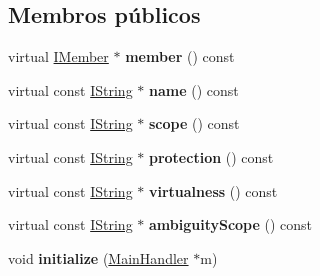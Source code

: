 \subsection*{Membros públicos}
\begin{DoxyCompactItemize}
\item 
\hypertarget{class_member_reference_a3db97c8ef39fd285ef6c96542ea50e11}{virtual \hyperlink{class_i_member}{I\-Member} $\ast$ {\bfseries member} () const }\label{class_member_reference_a3db97c8ef39fd285ef6c96542ea50e11}

\item 
\hypertarget{class_member_reference_a61b3e127d271cd613cc928e35f60125e}{virtual const \hyperlink{class_i_string}{I\-String} $\ast$ {\bfseries name} () const }\label{class_member_reference_a61b3e127d271cd613cc928e35f60125e}

\item 
\hypertarget{class_member_reference_a6a6e1de7787ea3956283635410ed1c58}{virtual const \hyperlink{class_i_string}{I\-String} $\ast$ {\bfseries scope} () const }\label{class_member_reference_a6a6e1de7787ea3956283635410ed1c58}

\item 
\hypertarget{class_member_reference_a24b1e5cd2d99544d15743ba66fe7a3f3}{virtual const \hyperlink{class_i_string}{I\-String} $\ast$ {\bfseries protection} () const }\label{class_member_reference_a24b1e5cd2d99544d15743ba66fe7a3f3}

\item 
\hypertarget{class_member_reference_afbdd0994aec9f99296d2fe6579920f51}{virtual const \hyperlink{class_i_string}{I\-String} $\ast$ {\bfseries virtualness} () const }\label{class_member_reference_afbdd0994aec9f99296d2fe6579920f51}

\item 
\hypertarget{class_member_reference_aa4e6ffd81018dfb52209c64ca2b530af}{virtual const \hyperlink{class_i_string}{I\-String} $\ast$ {\bfseries ambiguity\-Scope} () const }\label{class_member_reference_aa4e6ffd81018dfb52209c64ca2b530af}

\item 
\hypertarget{class_member_reference_ae0b91c6d4aea68cbf73c2d19d03a247c}{void {\bfseries initialize} (\hyperlink{class_main_handler}{Main\-Handler} $\ast$m)}\label{class_member_reference_ae0b91c6d4aea68cbf73c2d19d03a247c}

\end{DoxyCompactItemize}

